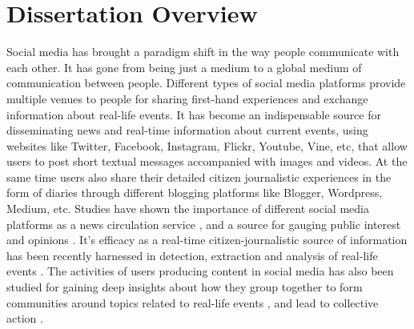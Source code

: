 
\chapter{Dissertation Overview} %

\label{overview} %



Social media has brought a paradigm shift in the way people communicate with each other. It has gone from being just a medium to a global medium of communication between people. Different types of social media platforms provide multiple venues to people for sharing first-hand experiences and exchange information about real-life events. It has become an indispensable source for disseminating news and real-time information about current events, using websites like Twitter, Facebook, Instagram, Flickr, Youtube, Vine, etc, that allow users to post short textual messages accompanied with images and videos. At the same time users also share their detailed citizen journalistic experiences in the form of diaries through different blogging platforms like Blogger, Wordpress, Medium, etc. Studies have shown the importance of different social media platforms as a news circulation service \cite{phelan2009using}, and a source for gauging public interest and opinions \cite{o2010tweets,singh2010clustering,singh2010mining,agarwal2012online}. It's efficacy as a real-time citizen-journalistic source of information has been recently harnessed in detection, extraction and analysis of real-life events \cite{sakaki2013tweet,popescu2011extracting,purohit2013twitris}. The activities of users producing content in social media has also been studied for gaining deep insights about how they group together to form communities around topics related to real-life events \cite{agarwal2013grouping,agarwal2014time,sen2012identifying}, and lead to collective action \cite{agarwal2014online,agarwal2012raising}.

